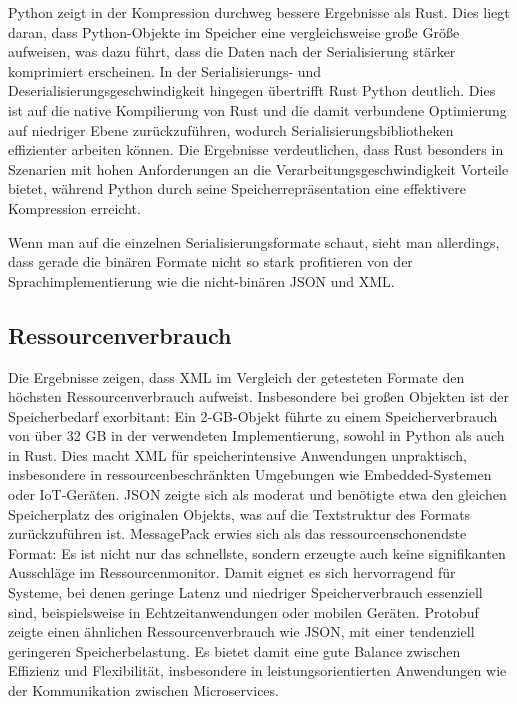 \documentclass[ngerman]{seminarvorlage}
\begin{document}
\newpage
Python zeigt in der Kompression durchweg bessere Ergebnisse als Rust. Dies liegt daran, dass Python-Objekte im Speicher eine vergleichsweise große Größe aufweisen, was dazu führt, dass die Daten nach der Serialisierung stärker komprimiert erscheinen. In der Serialisierungs- und Deserialisierungsgeschwindigkeit hingegen übertrifft Rust Python deutlich. Dies ist auf die native Kompilierung von Rust und die damit verbundene Optimierung auf niedriger Ebene zurückzuführen, wodurch Serialisierungsbibliotheken effizienter arbeiten können. Die Ergebnisse verdeutlichen, dass Rust besonders in Szenarien mit hohen Anforderungen an die Verarbeitungsgeschwindigkeit Vorteile bietet, während Python durch seine Speicherrepräsentation eine effektivere Kompression erreicht.

Wenn man auf die einzelnen Serialisierungsformate schaut, sieht man allerdings, dass gerade die binären Formate nicht so stark profitieren von der Sprachimplementierung wie die nicht-binären JSON und XML.

\subsection{Ressourcenverbrauch}
Die Ergebnisse zeigen, dass XML im Vergleich der getesteten Formate den höchsten Ressourcenverbrauch aufweist. Insbesondere bei großen Objekten ist der Speicherbedarf exorbitant: Ein 2-GB-Objekt führte zu einem Speicherverbrauch von über 32 GB in der verwendeten Implementierung, sowohl in Python als auch in Rust. Dies macht XML für speicherintensive Anwendungen unpraktisch, insbesondere in ressourcenbeschränkten Umgebungen wie Embedded-Systemen oder IoT-Geräten. JSON zeigte sich als moderat und benötigte etwa den gleichen Speicherplatz des originalen Objekts, was auf die Textstruktur des Formats zurückzuführen ist. MessagePack erwies sich als das ressourcenschonendste Format: Es ist nicht nur das schnellste, sondern erzeugte auch keine signifikanten Ausschläge im Ressourcenmonitor. Damit eignet es sich hervorragend für Systeme, bei denen geringe Latenz und niedriger Speicherverbrauch essenziell sind, beispielsweise in Echtzeitanwendungen oder mobilen Geräten. Protobuf zeigte einen ähnlichen Ressourcenverbrauch wie JSON, mit einer tendenziell geringeren Speicherbelastung. Es bietet damit eine gute Balance zwischen Effizienz und Flexibilität, insbesondere in leistungsorientierten Anwendungen wie der Kommunikation zwischen Microservices.
\end{document}
